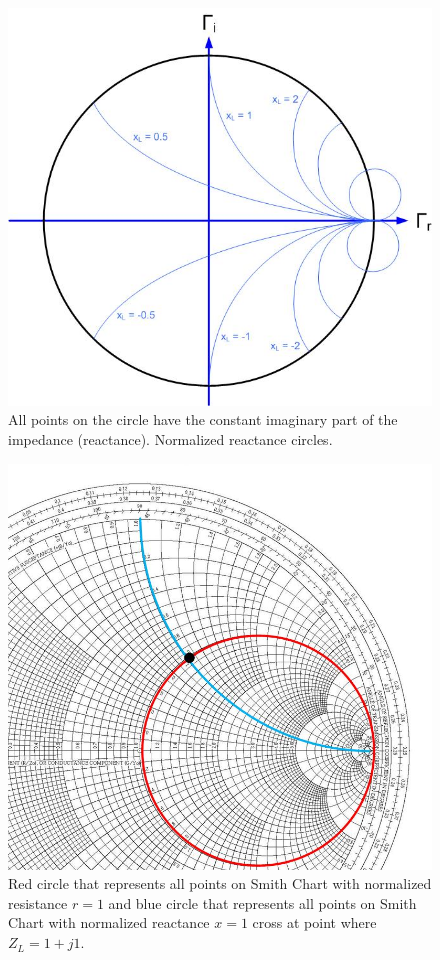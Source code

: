 \documentclass{ximera}
\begin{document}
\begin{figure}[htbp]
\begin{center}
\includegraphics[scale=0.3]{../jpg/smithchartimaginary.jpg}
\end{center}
\caption{All points on the circle have the constant imaginary part of the impedance (reactance). Normalized reactance circles.}
\label{screactance}
\end{figure}



\begin{figure}[htbp]
\begin{center}
\includegraphics[scale=0.3]{../jpg/FindingImpedanceonSC.jpg}
\end{center}
\caption{Red circle that represents all points on Smith Chart with normalized resistance $r=1$ and blue circle that represents all points on Smith Chart with  normalized reactance $x=1$ cross at point where $Z_L=1+j 1$.}
\label{scimpedance}
\end{figure}
\end{document}
